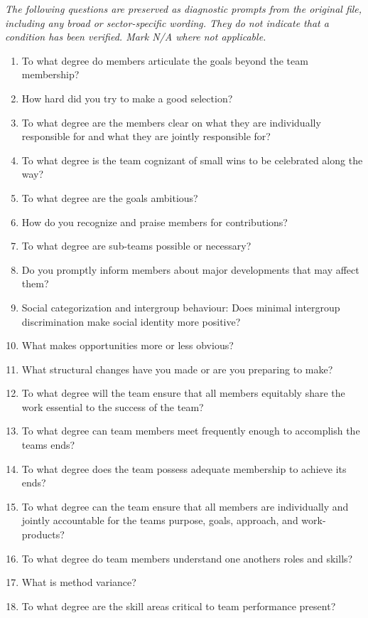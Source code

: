 \documentclass[10pt,letterpaper]{article}
\newcommand{\docsection}[1]{\par\Needspace{5\baselineskip}\vspace{8pt}{\large\sffamily\bfseries\color{navy}#1}\par\vspace{2pt}{\color{rulegrey}\rule{\linewidth}{.6pt}}\par}
\begin{document}
\docsection{03 \quad Source diagnostic checklist}
\textit{The following questions are preserved as diagnostic prompts from the original file, including any broad or sector-specific wording. They do not indicate that a condition has been verified. Mark N/A where not applicable.}
\begingroup\small\begin{enumerate}[leftmargin=2.1em, itemsep=4pt]
\item[1.] To what degree do members articulate the goals beyond the team membership?
\item[2.] How hard did you try to make a good selection?
\item[3.] To what degree are the members clear on what they are individually responsible for and what they are jointly responsible for?
\item[4.] To what degree is the team cognizant of small wins to be celebrated along the way?
\item[5.] To what degree are the goals ambitious?
\item[6.] How do you recognize and praise members for contributions?
\item[7.] To what degree are sub-teams possible or necessary?
\item[8.] Do you promptly inform members about major developments that may affect them?
\item[9.] Social categorization and intergroup behaviour: Does minimal intergroup discrimination make social identity more positive?
\item[10.] What makes opportunities more or less obvious?
\item[11.] What structural changes have you made or are you preparing to make?
\item[12.] To what degree will the team ensure that all members equitably share the work essential to the success of the team?
\item[13.] To what degree can team members meet frequently enough to accomplish the teams ends?
\item[14.] To what degree does the team possess adequate membership to achieve its ends?
\item[15.] To what degree can the team ensure that all members are individually and jointly accountable for the teams purpose, goals, approach, and work-products?
\item[16.] To what degree do team members understand one anothers roles and skills?
\item[17.] What is method variance?
\item[18.] To what degree are the skill areas critical to team performance present?

\end{enumerate}
\end{document}
